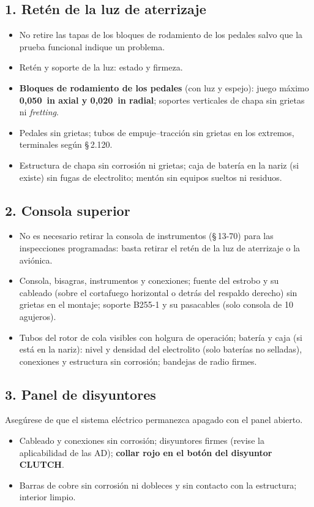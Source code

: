 \subsection*{1. Retén de la luz de aterrizaje}
\begin{itemize}
\item No retire las tapas de los bloques de rodamiento de los pedales salvo que la prueba funcional indique un problema.
\item Retén y soporte de la luz: estado y firmeza.
\item \textbf{Bloques de rodamiento de los pedales} (con luz y espejo): juego máximo \textbf{0,050~in axial y 0,020~in radial}; soportes verticales de chapa sin grietas ni \emph{fretting}.
\item Pedales sin grietas; tubos de empuje--tracción sin grietas en los extremos, terminales según \S\,2.120.
\item Estructura de chapa sin corrosión ni grietas; caja de batería en la nariz (si existe) sin fugas de electrolito; mentón sin equipos sueltos ni residuos.
\end{itemize}

\subsection*{2. Consola superior}
\begin{itemize}
\item No es necesario retirar la consola de instrumentos (\S\,13-70) para las inspecciones programadas: basta retirar el retén de la luz de aterrizaje o la aviónica.
\item Consola, bisagras, instrumentos y conexiones; fuente del estrobo y su cableado (sobre el cortafuego horizontal o detrás del respaldo derecho) sin grietas en el montaje; soporte B255-1 y su pasacables (solo consola de 10 agujeros).
\item Tubos del rotor de cola visibles con holgura de operación; batería y caja (si está en la nariz): nivel y densidad del electrolito (solo baterías no selladas), conexiones y estructura sin corrosión; bandejas de radio firmes.
\end{itemize}

\subsection*{3. Panel de disyuntores}
\begin{advertencia}
Asegúrese de que el sistema eléctrico permanezca apagado con el panel abierto.
\end{advertencia}
\begin{itemize}
\item Cableado y conexiones sin corrosión; disyuntores firmes (revise la aplicabilidad de las AD); \textbf{collar rojo en el botón del disyuntor \textsf{CLUTCH}}.
\item Barras de cobre sin corrosión ni dobleces y sin contacto con la estructura; interior limpio.
\end{itemize}

